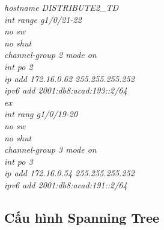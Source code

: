 \documentclass[a4paper, 12pt]{article}
\begin{document}
\hspace*{2cm}\textit{hostname DISTRIBUTE2\_TD\\
\hspace*{2cm}int range g1/0/21-22\\
\hspace*{2cm}no sw\\
\hspace*{2cm}no shut\\
\hspace*{2cm}channel-group 2 mode on\\
\hspace*{2cm}int po 2\\
\hspace*{2cm}ip add 172.16.0.62 255.255.255.252\\
\hspace*{2cm}ipv6 add 2001:db8:acad:193::2/64\\
\hspace*{2cm}ex\\
\hspace*{2cm}int rang g1/0/19-20\\
\hspace*{2cm}no sw\\
\hspace*{2cm}no shut\\
\hspace*{2cm}channel-group 3 mode on\\
\hspace*{2cm}int po 3\\
\hspace*{2cm}ip add 172.16.0.54 255.255.255.252\\
\hspace*{2cm}ipv6 add 2001:db8:acad:191::2/64\\}
\subsection{Cấu hình Spanning Tree }
\end{document}
